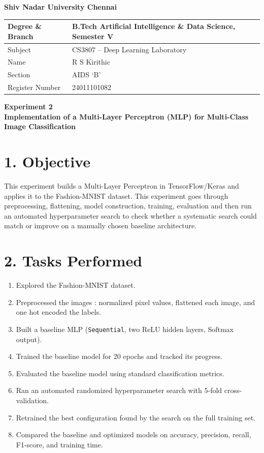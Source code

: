 \documentclass[11pt]{article}
\begin{document}
\begin{center}
{\Large\textbf{Shiv Nadar University Chennai}}
\end{center}

\renewcommand{\arraystretch}{1.25}

\begin{tabular}{|p{3.6cm}|p{7.6cm}|}
\hline
Degree \& Branch & B.Tech Artificial Intelligence \& Data Science, Semester V\\ \hline
Subject & CS3807 -- Deep Learning Laboratory\\ \hline
Name & R S Kirithic\\ \hline
Section & AIDS `B'\\ \hline
Register Number & 24011101082\\ \hline
\end{tabular}

\vspace{4mm}
\begin{center}
{\large\textbf{Experiment 2}}\\
{\large\textbf{Implementation of a Multi-Layer Perceptron (MLP) for Multi-Class Image Classification}}
\end{center}

\section*{1. Objective}
 This experiment builds a Multi-Layer Perceptron
in TensorFlow/Keras and applies it to the Fashion-MNIST dataset. This experiment goes through preprocessing, flattening, model construction, training, evaluation and then
run an automated hyperparameter search to check whether a systematic search could match or improve
on a manually chosen baseline architecture.

\section*{2. Tasks Performed}
\begin{enumerate}
\item Explored the Fashion-MNIST dataset.
\item Preprocessed the images : normalized pixel values, flattened each image, and one hot encoded the labels.
\item Built a baseline MLP (\texttt{Sequential}, two ReLU hidden layers, Softmax output).   
\item Trained the baseline model for 20 epochs and tracked its progress.
\item Evaluated the baseline model using standard classification metrics.
\item Ran an automated randomized hyperparameter search with 5-fold cross-validation.
\item Retrained the best configuration found by the search on the full training set.
\item Compared the baseline and optimized models on accuracy, precision, recall, F1-score, and training time.
\end{enumerate}
\end{document}

